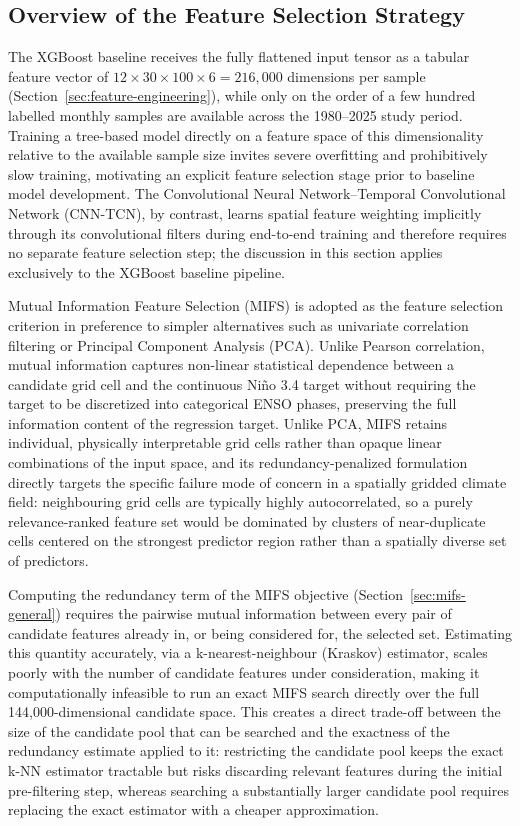 \subsection{Overview of the Feature Selection Strategy}
\label{sec:fs-overview}

The XGBoost baseline receives the fully flattened input tensor as a tabular feature vector of $12 \times 30 \times 100 \times 6 = 216{,}000$ dimensions per sample (Section~\ref{sec:feature-engineering}), while only on the order of a few hundred labelled monthly samples are available across the 1980--2025 study period. Training a tree-based model directly on a feature space of this dimensionality relative to the available sample size invites severe overfitting and prohibitively slow training, motivating an explicit feature selection stage prior to baseline model development. The Convolutional Neural Network--Temporal Convolutional Network (CNN-TCN), by contrast, learns spatial feature weighting implicitly through its convolutional filters during end-to-end training and therefore requires no separate feature selection step; the discussion in this section applies exclusively to the XGBoost baseline pipeline.

Mutual Information Feature Selection (MIFS) is adopted as the feature selection criterion in preference to simpler alternatives such as univariate correlation filtering or Principal Component Analysis (PCA). Unlike Pearson correlation, mutual information captures non-linear statistical dependence between a candidate grid cell and the continuous Ni\~{n}o 3.4 target without requiring the target to be discretized into categorical ENSO phases, preserving the full information content of the regression target. Unlike PCA, MIFS retains individual, physically interpretable grid cells rather than opaque linear combinations of the input space, and its redundancy-penalized formulation directly targets the specific failure mode of concern in a spatially gridded climate field: neighbouring grid cells are typically highly autocorrelated, so a purely relevance-ranked feature set would be dominated by clusters of near-duplicate cells centered on the strongest predictor region rather than a spatially diverse set of predictors.

Computing the redundancy term of the MIFS objective (Section~\ref{sec:mifs-general}) requires the pairwise mutual information between every pair of candidate features already in, or being considered for, the selected set. Estimating this quantity accurately, via a k-nearest-neighbour (Kraskov) estimator, scales poorly with the number of candidate features under consideration, making it computationally infeasible to run an exact MIFS search directly over the full 144,000-dimensional candidate space. This creates a direct trade-off between the size of the candidate pool that can be searched and the exactness of the redundancy estimate applied to it: restricting the candidate pool keeps the exact k-NN estimator tractable but risks discarding relevant features during the initial pre-filtering step, whereas searching a substantially larger candidate pool requires replacing the exact estimator with a cheaper approximation.

